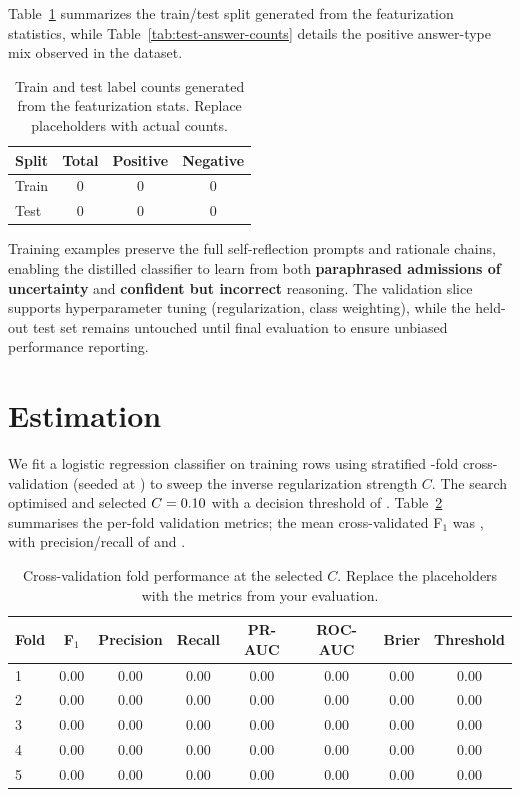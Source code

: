 \documentclass[11pt]{article}
\begin{document}
Table~\ref{tab:train-test-stats} summarizes the train/test split generated from the featurization statistics, while Table~\ref{tab:test-answer-counts} details the positive answer-type mix observed in the dataset.

\begin{table}[ht]
  \centering
  \renewcommand{\arraystretch}{1.2}
  \begin{tabular}{@{}lccc@{}}
    \toprule
    \textbf{Split} & \textbf{Total} & \textbf{Positive} & \textbf{Negative} \\
    \midrule
    Train & 0 & 0 & 0 \\
    Test & 0 & 0 & 0 \\
    \bottomrule
  \end{tabular}
  \caption{Train and test label counts generated from the featurization stats. Replace placeholders with actual counts.}
  \label{tab:train-test-stats}
\end{table}

Training examples preserve the full self-reflection prompts and rationale chains, enabling the distilled classifier to learn from both \textbf{paraphrased admissions of uncertainty} and \textbf{confident but incorrect} reasoning. The validation slice supports hyperparameter tuning (regularization, class weighting), while the held-out test set remains untouched until final evaluation to ensure unbiased performance reporting.
\section{Estimation}
We fit a logistic regression classifier on \EstTrainSize training rows using stratified \EstCvNSplits-fold cross-validation (seeded at \EstCvSeed) to sweep the inverse regularization strength \(C\). The search optimised \texttt{\EstCvObjective} and selected \(C = 0.10\) with a decision threshold of \EstFinalThreshold{}. Table~\ref{tab:cv-folds} summarises the per-fold validation metrics; the mean cross-validated F$_1$ was \EstCvFOne{}, with precision/recall of \EstCvPrecision{} and \EstCvRecall{}.

\begin{table}[ht]
  \centering
  \renewcommand{\arraystretch}{1.15}
  \begin{tabular}{@{}lccccccc@{}}
    \toprule
    \textbf{Fold} & \textbf{F$_1$} & \textbf{Precision} & \textbf{Recall} & \textbf{PR-AUC} & \textbf{ROC-AUC} & \textbf{Brier} & \textbf{Threshold} \\
    \midrule
    1 & 0.00 & 0.00 & 0.00 & 0.00 & 0.00 & 0.00 & 0.00 \\
    2 & 0.00 & 0.00 & 0.00 & 0.00 & 0.00 & 0.00 & 0.00 \\
    3 & 0.00 & 0.00 & 0.00 & 0.00 & 0.00 & 0.00 & 0.00 \\
    4 & 0.00 & 0.00 & 0.00 & 0.00 & 0.00 & 0.00 & 0.00 \\
    5 & 0.00 & 0.00 & 0.00 & 0.00 & 0.00 & 0.00 & 0.00 \\
    \bottomrule
  \end{tabular}
  \caption{Cross-validation fold performance at the selected \(C\). Replace the placeholders with the metrics from your evaluation.}
  \label{tab:cv-folds}
\end{table}
\end{document}

